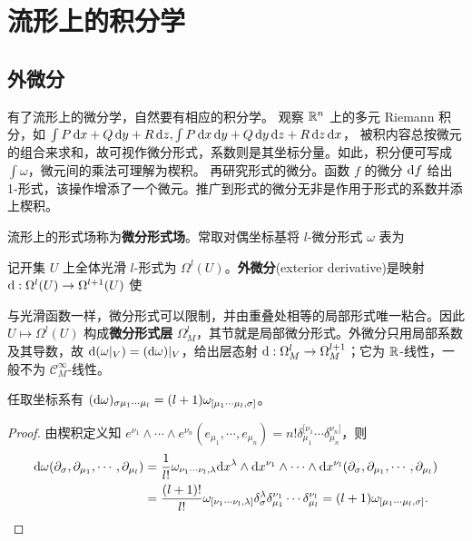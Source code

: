 \chapter{流形上的积分学}\label{appx:form}

\section{外微分}
有了流形上的微分学，自然要有相应的积分学。
观察 $\mathbb{R}^n$ 上的多元 Riemann 积分，如 $\int P\,\dd x+Q\,\dd y+R\,\dd z,\int P\,\dd x\,\dd y+Q\,\dd y\,\dd z+R\,\dd z\,\dd x$，
被积内容总按微元的组合来求和，故可视作微分形式，系数则是其坐标分量。如此，积分便可写成 $\int \omega$，微元间的乘法可理解为楔积。
再研究形式的微分。函数 $f$ 的微分 $\dd f$ 给出 1-形式，该操作增添了一个微元。推广到形式的微分无非是作用于形式的系数并添上楔积。

\begin{definition}
    流形上的形式场称为\textbf{微分形式场}。常取对偶坐标基将 $l$-微分形式 $\omega$ 表为
\end{definition}

\begin{definition}
    记开集 $U$ 上全体光滑 $l$-形式为 $\Omega^l(U)$。\textbf{外微分}(exterior derivative)是映射 $\dd:\Omega^l(U)\to\Omega^{l+1}(U)$ 使
\end{definition}

与光滑函数一样，微分形式可以限制，并由重叠处相等的局部形式唯一粘合。因此 $U\mapsto\Omega^l(U)$ 构成\textbf{微分形式层} $\Omega^l_M$，其节就是局部微分形式。外微分只用局部系数及其导数，故 $\dd(\omega|_V)=(\dd\omega)|_V$，给出层态射 $\dd:\Omega^l_M\to\Omega^{l+1}_M$；它为 $\mathbb{R}$-线性，一般不为 $\mathcal C^\infty_M$-线性。

\begin{theorem}
    任取坐标系有 $(\dd\omega)_{\sigma\mu_1\cdots\mu_l}=(l+1)\omega_{[\mu_1\cdots\mu_l,\sigma]}$。
\end{theorem}

\begin{proof}由楔积定义知 $e^{\nu_1}\wedge\cdots\wedge e^{\nu_n}(e_{\mu_1},\cdots,e_{\mu_n})=n!\delta_{\mu_1}^{[\nu_1}\cdots\delta_{\mu_n}^{\nu_n]}$，则
    \begin{align*}
        \dd\omega(\partial_{\sigma},\partial_{\mu_1},\cdots,\partial_{\mu_l})&=\frac{1}{l!}\omega_{\nu_1\cdots\nu_l,\lambda}\dd x^\lambda\wedge\dd x^{\nu_{1}}\wedge\cdots\wedge\dd x^{\nu_{l}}(\partial_{\sigma},\partial_{\mu_1},\cdots,\partial_{\mu_l})\\
        &=\frac{(l+1)!}{l!} \omega_{[\nu_1\cdots\nu_l,\lambda]} \delta_{\sigma}^{\lambda}\delta_{\mu_1}^{\nu_1}\cdots\delta_{\mu_l}^{\nu_l}=(l+1)\omega_{[\mu_1\cdots\mu_l,\sigma]}.\qedhere
    \end{align*}
\end{proof}

